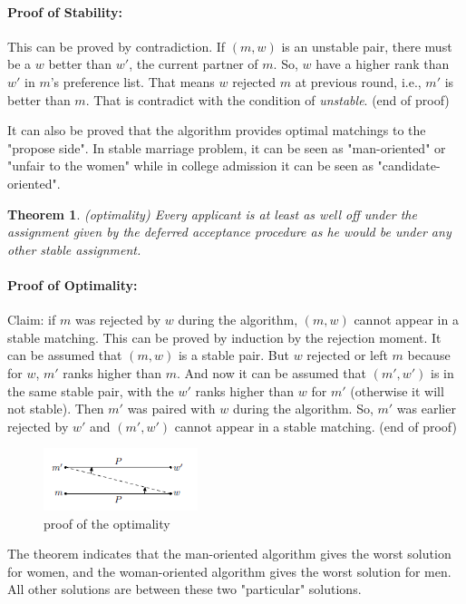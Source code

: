 \documentclass[14pt]{extarticle}
\newtheorem{theorem}{Theorem}
\begin{document}
\paragraph{Proof of Stability:} This can be proved by contradiction. If $(m,w)$ is an unstable pair, there must be a $w$ better than $w'$, the current partner of $m$.
So, $w$ have a higher rank than $w'$ in $m$'s preference list. That means $w$ rejected $m$ at previous round, i.e., $m'$ is better than $m$. 
That is contradict with the condition of {\it unstable}.    (end of proof)

It can also be proved that the algorithm provides optimal matchings to the "propose side". 
In stable marriage problem, it can be seen as "man-oriented" or "unfair to the women" while in college admission it can be seen as "candidate-oriented".
\begin{theorem}
  (optimality)
  Every applicant is at least as well off under the assignment given by the deferred acceptance procedure as he would be under any other stable assignment.\cite{GS1962}
\end{theorem}
\paragraph{Proof of Optimality:} Claim: if $m$ was rejected by $w$ during the algorithm, $(m,w)$ cannot appear in a stable matching.
This can be proved by induction by the rejection moment. It can be assumed that $(m,w)$ is a stable pair. But $w$ rejected or left $m$ because for $w$, $m'$ ranks higher than $m$.
And now it can be assumed that $(m',w')$ is in the same stable pair, with the $w'$ ranks higher than $w$ for $m'$ (otherwise it will not stable).
Then $m'$ was paired with $w$ during the algorithm. So, $m'$ was earlier rejected by $w'$ and $(m',w')$ cannot appear in a stable matching.    (end of proof)
\begin{figure}[H]
  \centering
  \includegraphics[width=0.4\textwidth]{optimality.png}
  \caption{proof of the optimality \cite{coursera}}
\end{figure}

The theorem indicates that the man-oriented algorithm gives the worst solution for women, and the woman-oriented algorithm gives the worst solution for men.
All other solutions are between these two "particular" solutions.
\end{document}
